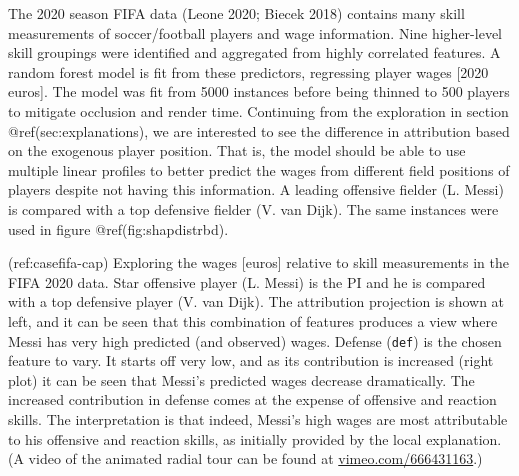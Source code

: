 \documentclass[
]{article}
\begin{document}
The 2020 season FIFA data (Leone 2020; Biecek 2018) contains many skill
measurements of soccer/football players and wage information. Nine
higher-level skill groupings were identified and aggregated from highly
correlated features. A random forest model is fit from these predictors,
regressing player wages {[}2020 euros{]}. The model was fit from 5000
instances before being thinned to 500 players to mitigate occlusion and
render time. Continuing from the exploration in section
@ref(sec:explanations), we are interested to see the difference in
attribution based on the exogenous player position. That is, the model
should be able to use multiple linear profiles to better predict the
wages from different field positions of players despite not having this
information. A leading offensive fielder (L. Messi) is compared with a
top defensive fielder (V. van Dijk). The same instances were used in
figure @ref(fig:shapdistrbd).

(ref:casefifa-cap) Exploring the wages {[}euros{]} relative to skill
measurements in the FIFA 2020 data. Star offensive player (L. Messi) is
the PI and he is compared with a top defensive player (V. van Dijk). The
attribution projection is shown at left, and it can be seen that this
combination of features produces a view where Messi has very high
predicted (and observed) wages. Defense (\texttt{def}) is the chosen
feature to vary. It starts off very low, and as its contribution is
increased (right plot) it can be seen that Messi's predicted wages
decrease dramatically. The increased contribution in defense comes at
the expense of offensive and reaction skills. The interpretation is that
indeed, Messi's high wages are most attributable to his offensive and
reaction skills, as initially provided by the local explanation. (A
video of the animated radial tour can be found at
\href{https://vimeo.com/666431163}{vimeo.com/666431163}.)
\end{document}
